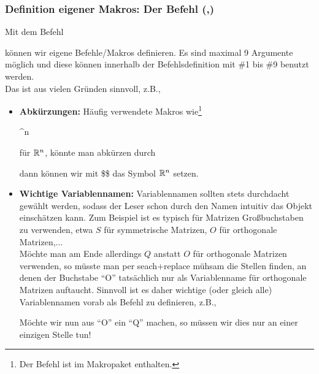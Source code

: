 \subsubsection{Definition eigener Makros: Der Befehl  (,)}
Mit dem Befehl
\begin{center}
\end{center}
können wir eigene Befehle/Makros definieren. Es sind maximal 9 Argumente möglich und diese können innerhalb der Befehlsdefinition mit \#1 bis \#9 benutzt werden. \\
Das ist aus vielen Gründen sinnvoll, z.B.,
\begin{itemize}
	\item \textbf{Abkürzungen:} Häufig verwendete Makros wie\footnote{Der Befehl  ist im Makropaket  enthalten.}
	\begin{center}
		\^{}n
	\end{center}
	für ${\mathbb{R}}^{n}$, könnte man abkürzen durch
	\begin{center}
\end{center}
	dann können wir mit \$\$ das Symbol ${\mathbb{R}}^{n}$ setzen.
	\item \textbf{Wichtige Variablennamen:} Variablennamen sollten stets durchdacht gewählt werden, sodass der Leser schon durch den Namen intuitiv das Objekt einschätzen kann. Zum Beispiel ist es typisch für Matrizen Großbuchstaben zu verwenden, etwa $S$ für symmetrische Matrizen, $O$ für orthogonale Matrizen,...\\
	Möchte man am Ende allerdings $Q$ anstatt $O$ für orthogonale Matrizen verwenden, so müsste man per seach+replace mühsam die Stellen finden, an denen der Buchstabe ``O'' tatsächlich nur als Variablenname für orthogonale Matrizen auftaucht. Sinnvoll ist es daher wichtige (oder gleich alle) Variablennamen vorab als Befehl zu definieren, z.B.,
		\begin{center}
	\end{center}
	Möchte wir nun aus ``O'' ein ``Q'' machen, so müssen wir dies nur an einer einzigen Stelle tun!
\end{itemize}










